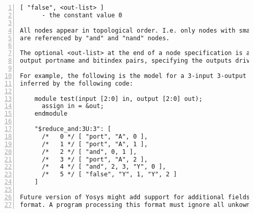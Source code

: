 \begin{lstlisting}[numbers=left,frame=single]
    [ "false", <out-list> ]
      - the constant value 0

All nodes appear in topological order. I.e. only nodes with smaller indices
are referenced by "and" and "nand" nodes.

The optional <out-list> at the end of a node specification is a list of
output portname and bitindex pairs, specifying the outputs driven by this node.

For example, the following is the model for a 3-input 3-output $reduce_and cell
inferred by the following code:

    module test(input [2:0] in, output [2:0] out);
      assign in = &out;
    endmodule

    "$reduce_and:3U:3": [
      /*   0 */ [ "port", "A", 0 ],
      /*   1 */ [ "port", "A", 1 ],
      /*   2 */ [ "and", 0, 1 ],
      /*   3 */ [ "port", "A", 2 ],
      /*   4 */ [ "and", 2, 3, "Y", 0 ],
      /*   5 */ [ "false", "Y", 1, "Y", 2 ]
    ]

Future version of Yosys might add support for additional fields in the JSON
format. A program processing this format must ignore all unkown fields.
\end{lstlisting}

